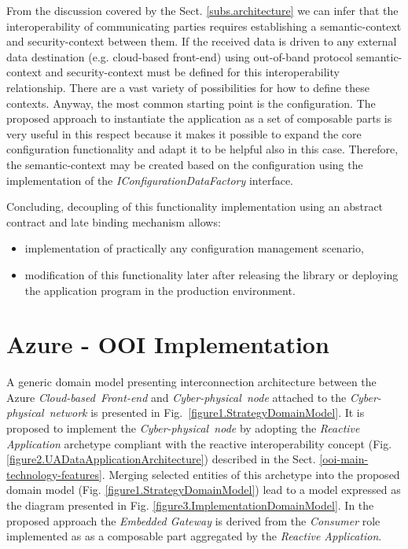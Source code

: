 \documentclass[runningheads]{llncs}
\begin{document}
From the discussion covered by the Sect. \ref{subs.architecture} we can infer that the interoperability of communicating parties requires establishing a semantic-context and security-context between them. If the received data is driven to any external data destination (e.g. cloud-based front-end) using out-of-band protocol semantic-context and security-context must be defined for this interoperability relationship. There are a vast variety of possibilities for how to define these contexts. Anyway, the most common starting point is the configuration. The proposed approach to instantiate the application as a set of composable parts is very useful in this respect because it makes it possible to expand the core configuration functionality and adapt it to be helpful also in this case. Therefore, the semantic-context may be created based on the configuration using the implementation of the \emph{IConfigurationDataFactory} interface.

Concluding, decoupling of this functionality implementation using an abstract contract and late binding mechanism allows:

\begin{itemize}
      \item implementation of practically any configuration management scenario,
      \item modification of this functionality later after releasing the library or deploying the application program in the production environment.
\end{itemize}

\section{Azure - OOI Implementation}\label{sect.gateway-implementation}

A generic domain model presenting interconnection architecture between the Azure \emph{Cloud-based\ Front-end} and \emph{Cyber-physical\ node} attached to the \emph{Cyber-physical\ network} is presented in Fig.~\ref{figure1.StrategyDomainModel}. It is proposed to implement the \emph{Cyber-physical\ node} by adopting the \emph{Reactive Application} archetype compliant with the reactive interoperability concept (Fig. \ref{figure2.UADataApplicationArchitecture}) described in the Sect. \ref{ooi-main-technology-features}. Merging selected entities of this archetype into the proposed domain model (Fig. \ref{figure1.StrategyDomainModel}) lead to a model expressed as the diagram presented in Fig. \ref{figure3.ImplementationDomainModel}. In the proposed approach the \emph{Embedded Gateway} is derived from the \emph{Consumer} role implemented as as a composable part aggregated by the \emph{Reactive Application}.
\end{document}
